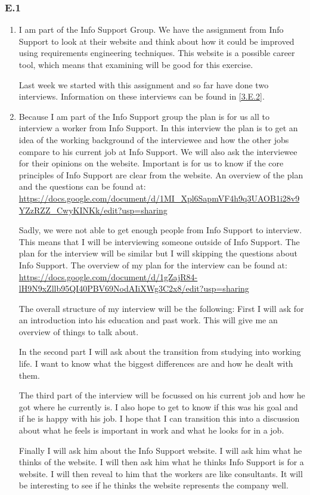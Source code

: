 \documentclass[]{article}
\begin{document}
\subsubsection*{E.1} 
\begin{enumerate}[a]
    \item I am part of the Info Support Group. We have the assignment from Info 
    Support to look at their website and think about how it could be improved 
    using requirements engineering techniques. This website is a possible career
    tool, which means that examining will be good for this exercise. 

    Last week we started with this assignment and so far have done two interviews.
    Information on these interviews can be found in \autoref{3.E.2}.  
    \item Because I am part of the Info Support group the plan is for us all to 
    interview a worker from Info Support. In this interview the plan is to get an 
    idea of the working background of the interviewee and how the other jobs 
    compare to his current job at Info Support. We will also ask the interviewee 
    for their opinions on the website. Important is for us to know if the core 
    principles of Info Support are clear from the website. An overview of the 
    plan and the questions can be found at: \url{https://docs.google.com/document/d/1MI_Xpl6SapmVF4h9q3UAOB1i28v9YZzRZZ_CwyKINKk/edit?usp=sharing}

    Sadly, we were not able to get enough people from Info Support to interview. 
    This means that I will be interviewing someone outside of Info Support. The 
    plan for the interview will be similar but I will skipping the questions 
    about Info Support. The overview of my plan for the interview can be found 
    at: \url{https://docs.google.com/document/d/1gZajR84-lH9N9xZllb95QI40PBV69NodAIiXWg3C2x8/edit?usp=sharing}

    The overall structure of my interview will be the following: First I will 
    ask for an introduction into his education and past work. This will 
    give me an overview of things to talk about. 

    In the second part I will ask about the transition from studying into working 
    life. I want to know what the biggest differences are and how he dealt with 
    them. 

    The third part of the interview will be focussed on his current job and 
    how he got where he currently is. I also hope to get to know if this was 
    his goal and if he is happy with his job. I hope that I can transition this into 
    a discussion about what he feels is important in work and what he looks for 
    in a job. 

    Finally I will ask him about the Info Support website. I will ask him what 
    he thinks of the website. I will then ask him what he thinks Info Support 
    is for a website. I will then reveal to him that the workers are like consultants.
    It will be interesting to see if he thinks the website represents the 
    company well.

\end{enumerate}
\end{document}
